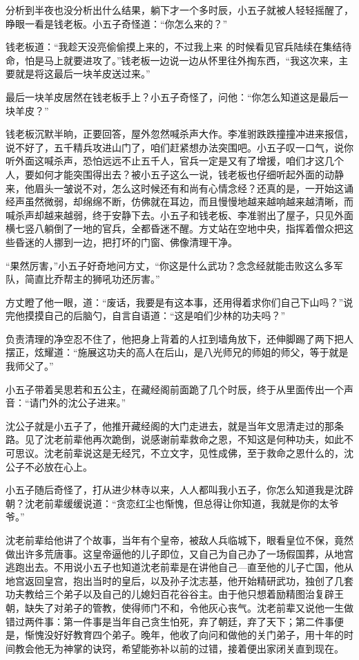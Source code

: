 分析到半夜也没分析出什么结果，躺下才一个多时辰，小五子就被人轻轻摇醒了，睁眼一看是钱老板。小五子奇怪道：“你怎么来的？”

钱老板道：“我趁天没亮偷偷摸上来的，不过我上来
的时候看见官兵陆续在集结待命，怕是马上就要进攻了。”钱老板一边说一边从怀里往外掏东西，“我这次来，主要就是将这最后一块羊皮送过来。”

最后一块羊皮居然在钱老板手上？小五子奇怪了，问他：“你怎么知道这是最后一块羊皮？”

钱老板沉默半晌，正要回答，屋外忽然喊杀声大作。李准驸跌跌撞撞冲进来报信，说不好了，五千精兵攻进山门了，咱们赶紧想办法突围吧。小五子叹一口气，说你听外面这喊杀声，恐怕远远不止五千人，官兵一定是又有了增援，咱们才这几个人，要如何才能突围得出去？被小五子这么一说，钱老板也仔细听起外面的动静来，他眉头一皱说不对，怎么这时候还有和尚有心情念经？还真的是，一开始这诵经声虽然微弱，却绵绵不断，仿佛就在耳边，而且慢慢地越来越响越来越清晰，而喊杀声却越来越弱，终于安静下去。小五子和钱老板、李准驸出了屋子，只见外面横七竖八躺倒了一地的官兵，全都昏迷不醒。方丈站在空地中央，指挥着僧众把这些昏迷的人挪到一边，把打坏的门窗、佛像清理干净。

“果然厉害，”小五子好奇地问方丈，“你这是什么武功？念念经就能击败这么多军队，简直比乔帮主的狮吼功还厉害。”

方丈瞪了他一眼，道：“废话，我要是有这本事，还用得着求你们自己下山吗？”说完他摸摸自己的后脑勺，自言自语道：“这是咱们少林的功夫吗？”

负责清理的净空忍不住了，他把身上背着的人扛到墙角放下，还伸脚踢了两下把人摆正，炫耀道：“施展这功夫的高人在后山，是八光师兄的师姐的师父，等于就是我师父了。”
\newline

小五子带着吴思若和五公主，在藏经阁前面跪了几个时辰，终于从里面传出一个声音：“请门外的沈公子进来。”

沈公子就是小五子了，他推开藏经阁的大门走进去，就是当年文思清走过的那条路。见了沈老前辈他再次跪倒，说感谢前辈救命之恩，不知这是何种功夫，如此不可思议。沈老前辈说这是无经咒，不立文字，见性成佛，至于救命之恩什么的，沈公子不必放在心上。

小五子随后奇怪了，打从进少林寺以来，人人都叫我小五子，你怎么知道我是沈辟朝？沈老前辈缓缓说道：“贪恋红尘也惭愧，但总得让你知道，我就是你的太爷爷。”

沈老前辈给他讲了个故事，当年有个皇帝，被敌人兵临城下，眼看皇位不保，竟然做出许多荒唐事。这皇帝逼他的儿子即位，又自己为自己办了一场假国葬，从地宫逃跑出去。不用说小五子也知道沈老前辈是在讲他自己—直至他的儿子亡国，他从地宫返回皇宫，抱出当时的皇后，以及孙子沈志基，他开始精研武功，独创了几套功夫教给三个弟子以及自己的儿媳妇百花谷谷主。由于他只想着励精图治复辟王朝，缺失了对弟子的管教，使得师门不和，令他灰心丧气。沈老前辈又说他一生做错过两件事：第一件事是当年自己贪生怕死，弃了朝廷，弃了天下；第二件事便是，惭愧没好好教育四个弟子。晚年，他收了向问和做他的关门弟子，用十年的时间教会他无为神掌的诀窍，希望能弥补以前的过错，接着便出家闭关直到现在。

